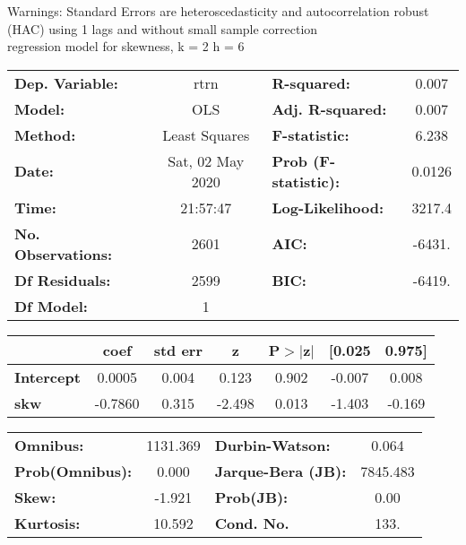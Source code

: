 Warnings: \newline
 [1] Standard Errors are heteroscedasticity and autocorrelation robust (HAC) using 1 lags and without small sample correction\\ 

regression model for skewness, k = 2 h = 6\begin{center}
\begin{tabular}{lclc}
\toprule
\textbf{Dep. Variable:}    &       rtrn       & \textbf{  R-squared:         } &     0.007   \\
\textbf{Model:}            &       OLS        & \textbf{  Adj. R-squared:    } &     0.007   \\
\textbf{Method:}           &  Least Squares   & \textbf{  F-statistic:       } &     6.238   \\
\textbf{Date:}             & Sat, 02 May 2020 & \textbf{  Prob (F-statistic):} &   0.0126    \\
\textbf{Time:}             &     21:57:47     & \textbf{  Log-Likelihood:    } &    3217.4   \\
\textbf{No. Observations:} &        2601      & \textbf{  AIC:               } &    -6431.   \\
\textbf{Df Residuals:}     &        2599      & \textbf{  BIC:               } &    -6419.   \\
\textbf{Df Model:}         &           1      & \textbf{                     } &             \\
\bottomrule
\end{tabular}
\begin{tabular}{lcccccc}
                   & \textbf{coef} & \textbf{std err} & \textbf{z} & \textbf{P$> |$z$|$} & \textbf{[0.025} & \textbf{0.975]}  \\
\midrule
\textbf{Intercept} &       0.0005  &        0.004     &     0.123  &         0.902        &       -0.007    &        0.008     \\
\textbf{skw}       &      -0.7860  &        0.315     &    -2.498  &         0.013        &       -1.403    &       -0.169     \\
\bottomrule
\end{tabular}
\begin{tabular}{lclc}
\textbf{Omnibus:}       & 1131.369 & \textbf{  Durbin-Watson:     } &    0.064  \\
\textbf{Prob(Omnibus):} &   0.000  & \textbf{  Jarque-Bera (JB):  } & 7845.483  \\
\textbf{Skew:}          &  -1.921  & \textbf{  Prob(JB):          } &     0.00  \\
\textbf{Kurtosis:}      &  10.592  & \textbf{  Cond. No.          } &     133.  \\
\bottomrule
\end{tabular}
\end{center}

